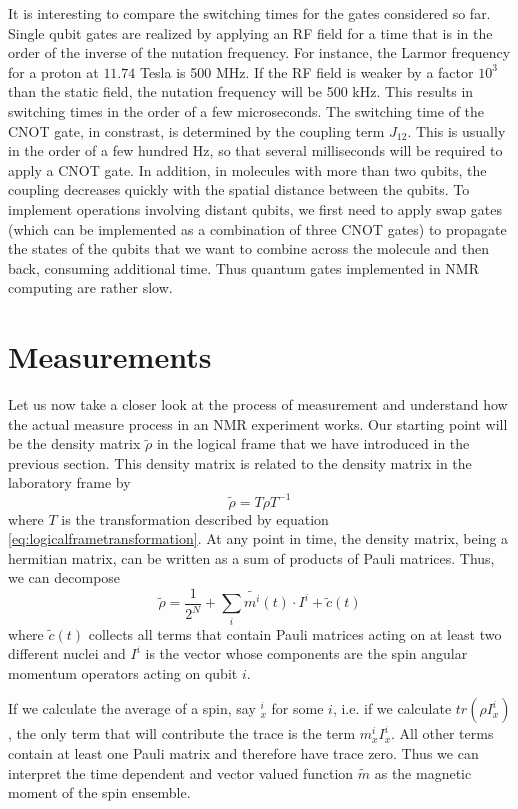 \documentclass[a4paper, draft]{article}
\theoremstyle{own}
\theoremstyle{remark}
\begin{document}
It is interesting to compare the switching times for the gates considered so far. Single qubit gates are realized by applying an RF field for a time that is in the order of the inverse of the nutation frequency. For instance, the Larmor frequency for a proton at $11.74$ Tesla is 500 MHz. If the RF field is weaker by a factor $10^3$ than the static field, the nutation frequency will be 500 kHz. This results in switching times in the order of a few microseconds. The switching time of the CNOT gate, in constrast, is determined by the coupling term $J_{12}$. This is usually in the order of a few hundred Hz, so that several milliseconds will be required to apply a CNOT gate. In addition, in molecules with more than two qubits, the coupling decreases quickly with the spatial distance between the qubits. To implement operations involving distant qubits, we first need to apply swap gates (which can be implemented as a combination of three CNOT gates) to propagate the states of the qubits that we want to combine across the molecule and then back, consuming additional time. Thus quantum gates implemented in NMR computing are rather slow. 


\section{Measurements}\label{sec:measurements}

Let us now take a closer look at the process of measurement and understand how the actual measure process in an NMR experiment works. Our starting point will be the density matrix $\widetilde{\rho}$ in the logical frame that we have introduced in the previous section. This density matrix is related to the density matrix in the laboratory frame by
$$
\widetilde{\rho} = T \rho T^{-1}
$$
where $T$ is the transformation described by equation \eqref{eq:logicalframetransformation}. At any point in time, the density matrix, being a hermitian matrix, can be written as a sum of products of Pauli matrices. Thus, we can decompose
$$
\widetilde{\rho} = \frac{1}{2^N} + \sum_i \widetilde{m^i}(t) \cdot I^i + \widetilde{c}(t)
$$
where $\widetilde{c}(t)$ collects all terms that contain Pauli matrices acting on at least two different nuclei and $I^i$ is the vector whose components are the spin angular momentum operators acting on qubit $i$. 

If we calculate the average of a spin, say $_x^i$ for some $i$, i.e. if we calculate $tr(\rho I_x^i)$, the only term that will contribute the trace is the term $m^i_x I_x^i$. All other terms contain at least one Pauli matrix and therefore have trace zero. Thus we can interpret the time dependent and vector valued function $\widetilde{m}$ as the magnetic moment of the spin ensemble. 
\end{document}
